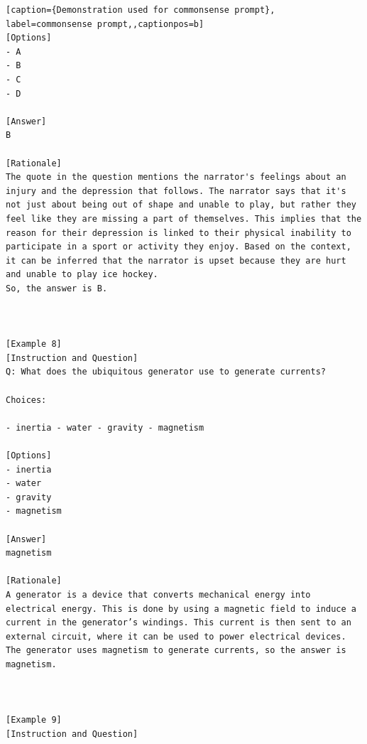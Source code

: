\begin{lstlisting}[caption={Demonstration used for commonsense prompt}, label=commonsense prompt,,captionpos=b]
[Options]
- A
- B
- C
- D

[Answer]
B

[Rationale]
The quote in the question mentions the narrator's feelings about an injury and the depression that follows. The narrator says that it's not just about being out of shape and unable to play, but rather they feel like they are missing a part of themselves. This implies that the reason for their depression is linked to their physical inability to participate in a sport or activity they enjoy. Based on the context, it can be inferred that the narrator is upset because they are hurt and unable to play ice hockey.
So, the answer is B.



[Example 8]
[Instruction and Question]
Q: What does the ubiquitous generator use to generate currents?

Choices:

- inertia - water - gravity - magnetism

[Options]
- inertia
- water
- gravity
- magnetism

[Answer]
magnetism

[Rationale]
A generator is a device that converts mechanical energy into electrical energy. This is done by using a magnetic field to induce a current in the generator’s windings. This current is then sent to an external circuit, where it can be used to power electrical devices. The generator uses magnetism to generate currents, so the answer is magnetism.



[Example 9]
[Instruction and Question]

    \end{lstlisting}
    




